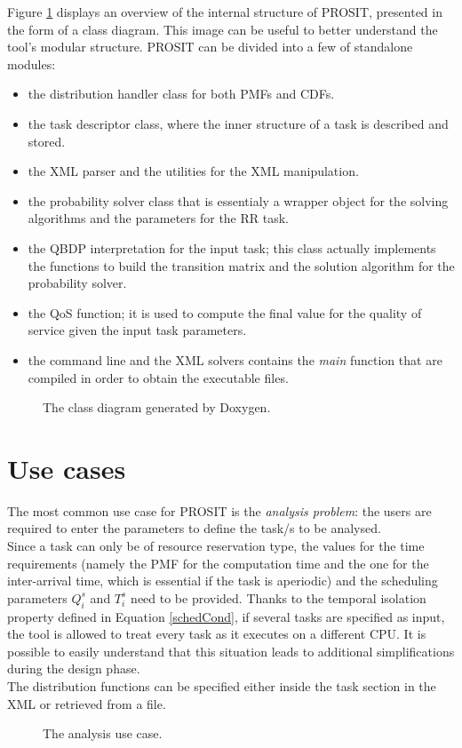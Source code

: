 Figure \ref{classdiagram} displays an overview of the internal structure of PROSIT, presented in the form of a class diagram. This image can be useful to better understand the tool's modular structure. PROSIT can be divided into a few of standalone modules:
\begin{itemize}
  \item the distribution handler class for both PMFs and CDFs.
  \item the task descriptor class, where the inner structure of a task is described and stored.
  \item the XML parser and the utilities for the XML manipulation.
  \item the probability solver class that is essentialy a wrapper object for the solving algorithms and the parameters for the RR task.
  \item the QBDP interpretation for the input task; this class actually implements the functions to build the transition matrix and the solution algorithm for the probability solver.
  \item the QoS function; it is used to compute the final value for the quality of service given the input task parameters.
  \item the command line and the XML solvers contains the \emph{main} function that are compiled in order to obtain the executable files.
\end{itemize}   

\begin{figure}[H]
  \caption{The class diagram generated by Doxygen.}
  \label{classdiagram}
\end{figure}

\section{Use cases}
The most common use case for PROSIT is the \emph{analysis problem}: the users are required to enter the parameters to define the task/s to be analysed.\\
Since a task can only be of resource reservation type, the values for the time requirements (namely the PMF for the computation time and the one for the inter-arrival time, which is essential if the task is aperiodic) and the scheduling parameters \( Q_{i}^s \) and \( T_{i}^s \) need to be provided. Thanks to the temporal isolation property defined in Equation \ref{schedCond}, if several tasks are specified as input, the tool is allowed to treat every task as it executes on a different CPU. It is possible to easily understand that this situation leads to additional simplifications during the design phase.\\ 
The distribution functions can be specified either inside the task section in the XML or retrieved from a file.
\begin{figure}[H]
  \caption{The analysis use case.}
  \label{usecase}
\end{figure}

